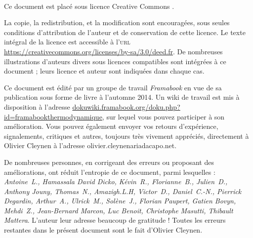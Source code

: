 \clearpage\thispagestyle{empty}



\vspace{-0.5cm}
{\center \normalsize \huge \ccLogo\ \ccAttribution\ \ccShareAlike \par}
\vspace{0.5cm}

Ce document est placé sous licence Creative Commons \myccbysa.

La copie, la redistribution, et la modification sont encouragées, sous seules conditions d’attribution de l’auteur et de conservation de cette licence. Le texte intégral de la licence est accessible à l’\textsc{url} \href{https://creativecommons.org/licenses/by-sa/3.0/deed.fr}{https://creativecommons.org/licenses/by-sa/3.0/deed.fr}. De nombreuses illustrations d’auteurs divers sous licences compatibles sont intégrées à ce document ; leurs licence et auteur sont indiquées dans chaque cas.

\vspace{0.3cm}
\vspace{0.1cm}

Ce document est édité par un groupe de travail \textit{Framabook} en vue de sa publication sous forme de livre à l’automne 2014. Un wiki de travail est mis à disposition à l’adresse \href{http://dokuwiki.framabook.org/doku.php?id=framabookthermodynamique}{dokuwiki.framabook.org/doku.php?id=framabookthermodynamique}, sur lequel vous pouvez participer à son amélioration. Vous pouvez également envoyer vos retours d’expérience, signalements, critiques et autres, toujours très vivement appréciés, directement à Olivier Cleynen à l’adresse olivier.cleynenariadacapo.net.

De nombreuses personnes, en corrigeant des erreurs ou proposant des améliorations, ont réduit l’entropie de ce document, parmi lesquelles : {\small\textit{Antoine\ L., Hamassala David Dicko, Kévin\ R., Florianne\ B., Julien\ D., Anthony Jouny, Thomas\ N., Amazigh.L.H, Victor\ D., Daniel\ C.-N., Pierrick Degardin, Arthur\ A., Ulrick\ M., Solène\ J., Florian Paupert, Gatien Bovyn, Mehdi\ Z., Jean-Bernard Marcon, Luc Benoit, Christophe Masutti, Thibault Mattera}}. L’auteur leur adresse beaucoup de gratitude ! Toutes les erreurs restantes dans le présent document sont le fait d’Olivier Cleynen.

\vspace{0.3cm}


\restoregeometry

